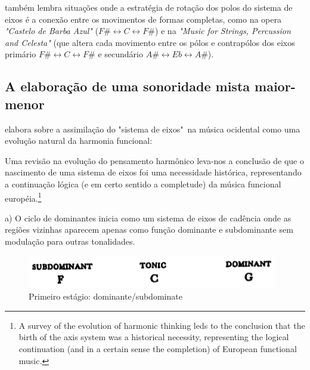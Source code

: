 \documentclass[
	12pt,				%
	openright,			%
	twoside,			%
	a4paper,			%
	english,			%
	french,				%
	spanish,			%
	brazil				%
	]{abntex2}
\begin{document}
 também lembra situações onde a estratégia de rotação dos polos do sistema de eixos é a conexão entre os movimentos de formas completas, como na opera \textit{"Castelo de Barba Azul"} ($F\# \leftrightarrow  C \leftrightarrow F\#$) e na \textit{"Music for Strings, Percussion and Celesta" } (que altera cada movimento entre os pólos e contrapólos dos eixos primário $F\# \leftrightarrow  C \leftrightarrow F\#$ e secundário $A\# \leftrightarrow  Eb \leftrightarrow A\#$).


\subsection{A elaboração de uma sonoridade mista maior-menor}
\label{lendvai_maior_menor}



 elabora sobre a assimilação do "sistema de eixos"\ na música ocidental como uma evolução natural da harmonia funcional:  

\begin{citacao}
Uma revisão na evolução do pensamento harmônico leva-nos a conclusão de que o nascimento de uma sistema de eixos foi uma necessidade histórica, representando a continuação lógica (e em certo sentido a completude) da música funcional européia.\cite[ p.08]{lendvai1971bela}\footnote{A survey of the evolution of harmonic thinking leds to the conclusion that the birth of the axis system was a historical necessity, representing the logical continuation (and in a certain sense the completion) of European functional music.\cite[ p.08]{lendvai1971bela}}
\end{citacao}


a) O ciclo de dominantes inicia como um sistema de eixos de cadência onde as regiões vizinhas aparecem apenas como função dominante e subdominante sem modulação para outras tonalidades. 

\begin{figure}[!h]
	\caption{\label{fig_grafico}Primeiro estágio: dominante/subdominate}
	\begin{center}
	    \includegraphics[scale=0.5]{axis/estagio01.png}
	\end{center}
\end{figure}
\end{document}
